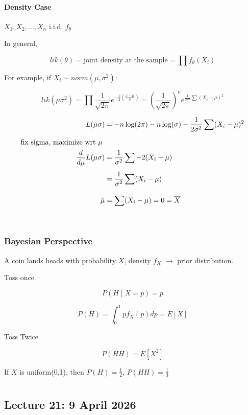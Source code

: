 \documentclass{report}
\begin{document}
\subsubsection{Density Case}


$ X_1, X_2, \dots, X_n $ i.i.d. $ f_{\theta} $ 

In general, 

\[
lik(\theta) = \text{joint density at the sample} = \prod f_{\theta}(X_{i})
\]

For example, if $ X_{i} \sim norm(\mu, \sigma^{2})$: 

\[
	lik(\mu \sigma^{2})  = \prod \frac{1}{\sqrt{2\pi}}e^{-\frac{1}{2} \left( \frac{x-\mu }{\sigma } \right) } = \left( \frac{1}{\sqrt{2\pi}} \right) ^{n} e^{\frac{1}{2\sigma^{2}} \sum_{}^{} (X_{i} - \mu )^{2}}
\] 

\begin{align*}
	L(\mu \sigma) &= -n \log(2\pi) - n\log(\sigma) - \frac{1}{2\sigma^{2}} \sum_{}^{}(X_{i} - \mu )^{2}\\
	\text{fix sigma, maximize wrt $ \mu  $ } \\
	\frac{d}{d\mu }L(\mu \sigma) &= \frac{1}{\sigma^{2}} \sum_{}^{} -2(X_{i} - \mu ) \\ 
	&= \frac{1}{\sigma^{2}} \sum_{}^{} (X_{i} - \mu ) \\
	\hat \mu  &= \sum_{}^{} (X_{i} - \mu ) = 0 = \overline{X} \\ \\
\end{align*}


\subsection{Bayesian Perspective}
A coin lands heads with probability $ X $, density $ f_{X} $ $ \rightarrow $ prior distribution.


Toss once. 

\[
	P(H \mid X = p) = p
\]

\[
	P(H) = \int_{0}^{1}p f_{X}(p)dp = E[X]
\]

Toss Twice

\[
P(HH) = E[X^{2}]
\]

If $ X $ is uniform(0,1), then $ P(H) = \frac{1}{2} $,  $ P(HH) = \frac{1}{3} $ 



\chapter{}
\section{Lecture 21: 9 April 2026}
\end{document}
